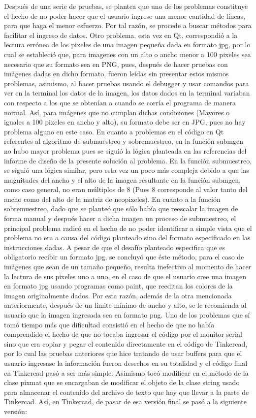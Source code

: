 \documentclass{article}
\begin{document}
Después de una serie de pruebas, se plantea que uno de los problemas constituye el hecho de no poder hacer que el usuario ingrese una menor cantidad de líneas, para que haga el menor esfuerzo. Por tal razón, se procede a buscar métodos para facilitar el ingreso de datos. Otro problema, esta vez en Qt, correspondió a la lectura errónea de los pixeles de una imagen pequeña dada en formato jpg, por lo cual se estableció que, para imagenes con un alto o ancho menor a 100 pixeles sea necesario que su formato sea en PNG, pues, después de hacer pruebas con imágenes dadas en dicho formato, fueron leídas sin presentar estos mismos problemas, asimismo, al hacer pruebas usando el debugger y usar comandos para ver en la terminal los datos de la imagen, los datos dados en la terminal variaban con respecto a los que se obtenían a cuando se corría el programa de manera normal. Así, para imágenes que no cumplan dichas condiciones (Mayores o iguales a 100 pixeles en ancho y alto), su formato debe ser en JPG, pues no hay problema alguno en este caso.
En cuanto a problemas en el código en Qt referentes al algoritmo de submuestreo y sobremuestreo, en la función submgen no hubo mayor problema pues se siguió la lógica planteada en las referencias del informe de diseño de la presente solución al problema.
En la función submuestreo, se siguió una lógica similar, pero esta vez un poco más compleja debido a que las magnitudes del ancho y el alto de la imagen resultante en la función submgen, como caso general, no eran múltiplos de 8 (Pues 8 corresponde al valor tanto del ancho como del alto de la matriz de neopixeles).
En cuanto a la función sobremuestreo, dado que se planteó que sólo había que reescalar la imagen de forma manual y después hacer a dicha imagen un proceso de submuestreo, el principal problema radicó en el hecho de no poder identificar a simple vista que el problema no era a causa del código planteado sino del formato especificado en las instrucciones dadas. A pesar de que el desafío planteado especifica que es obligatorio recibir un formato jpg, se concluyó que éste método, para el caso de imágenes que sean de un tamaño pequeño, resulta inefectivo al momento de hacer la lectura de sus pixeles uno a uno, en el caso de que el usuario cree una imagen en formato jpg usando programas como paint, que reeditan los colores de la imagen originalmente dados. Por esta razón, además de la otra mencionada anteriormente, después de un límite mínimo de ancho y alto, se le recomienda al usuario que la imagen ingresada sea en formato png.
Uno de los problemas que sí tomó tiempo más que dificultad consistió en el hecho de que no había comprendido el hecho de que no tocaba ingresar el código por el monitor serial sino que era copiar y pegar el contenido directamente en el código de Tinkercad, por lo cual las pruebas anteriores que hice tratando de usar buffers para que el usuario ingresase la información fueron desechos en su totalidad y el código final en Tinkercad pasó a ser más simple. Asimismo tocó modificar en el método de la clase pixmat que se encargaban de modificar el objeto de la clase string usado para almacenar el contenido del archivo de texto que hay que llevar a la parte de Tinkercad. Así, en Tinkercad, de pasar de esa versión final se pasó a la siguiente versión: 
\end{document}
